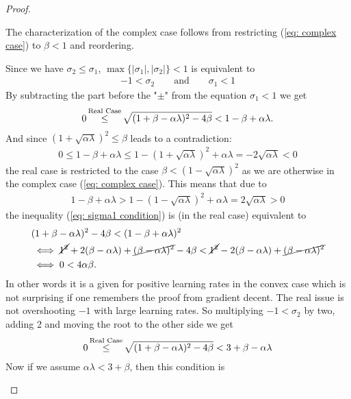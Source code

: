 \begin{proof}
\begin{description}[wide, labelindent=0pt]
		The characterization of the complex case follows from restricting
		(\ref{eq: complex case}) to \(\beta<1\) and reordering.
		\item[Real Case:] Since we have \(\sigma_2 \le \sigma_1\),
		\(\max\{|\sigma_1|,|\sigma_2|\}<1\) is equivalent to
		\begin{align*}
			-1 < \sigma_2 \qquad \text{and} \qquad \sigma_1 < 1
		\end{align*}
		By subtracting the part before the "\(\pm\)" from the equation \(\sigma_1<1\)
		we get
		\begin{align}\label{eq: sigma1 condition}
			0\xle{\text{Real Case}} \sqrt{(1+\beta-\alpha\lambda)^2 -4\beta} < 1-\beta +\alpha\lambda.
		\end{align}
		And since \((1+\sqrt{\alpha\lambda})^2 \le \beta\) leads to a contradiction:
		\begin{align*}
			0 \le 1-\beta+\alpha\lambda \le 1-(1+\sqrt{\alpha\lambda})^2 +\alpha\lambda
			= -2\sqrt{\alpha\lambda} < 0
		\end{align*}
		the real case is restricted to the case \(\beta < (1-\sqrt{\alpha\lambda})^2\)
		as we are otherwise in the complex case (\ref{eq: complex case}).
		This means that due to
		\begin{align*}
			1-\beta+\alpha\lambda
			> 1 - (1-\sqrt{\alpha\lambda})^2 + \alpha\lambda
			= 2\sqrt{\alpha\lambda}>0
		\end{align*}
		the inequality (\ref{eq: sigma1 condition}) is (in the real case) equivalent to
		\begin{align*}
			&(1+\beta-\alpha\lambda)^2 - 4\beta < (1-\beta+\alpha\lambda)^2\\
			&\iff \cancel{1^2} + 2(\beta-\alpha\lambda) + 
			\cancel{(\beta-\alpha\lambda)^2} - 4\beta
			< \cancel{1^2} - 2(\beta-\alpha\lambda) + 
			\cancel{(\beta-\alpha\lambda)^2}\\
			&\iff 0 < 4\alpha\beta.
		\end{align*}
		In other words it is a given for positive learning rates in the convex	
		case which is not surprising if one remembers the proof from gradient
		decent. The real issue is not overshooting \(-1\) with large learning
		rates. So multiplying \(-1<\sigma_2\) by two, adding 2 and moving the
		root to the other side we get
		\begin{align}\label{eq: from -1<sigma_2 followed}
			0 \xle{\text{Real Case}} \sqrt{(1+\beta-\alpha\lambda)^2 - 4\beta}
			< 3+\beta-\alpha\lambda
		\end{align}
		Now if we assume \(\alpha\lambda < 3+\beta\), then this condition is

\end{description}
\end{proof}
